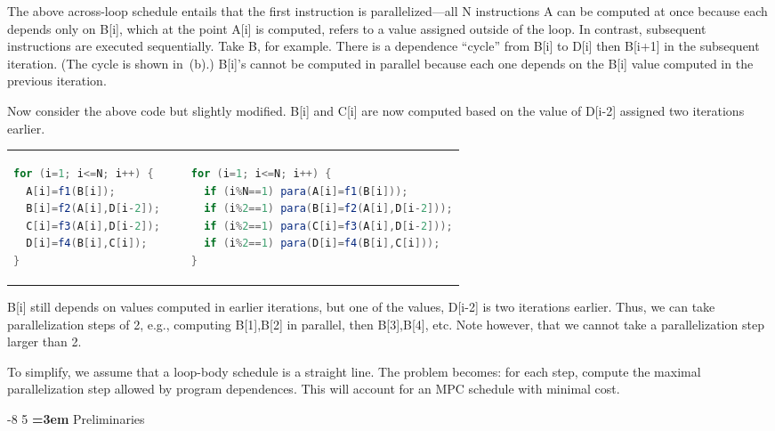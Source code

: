 \documentclass[sigconf, screen, natbib=false, dvipsnames, table]{acmart}
\makeatletter
\renewcommand{\subsection}{\@startsection{subsection}{2}{\z@}%
                        {-8\p@ \@plus -4\p@ \@minus -4\p@}%
                        {5\p@ \@plus 2\p@ \@minus 2\p@}%
                        {\normalfont\Large\bfseries\boldmath
                         \rightskip=\z@ \@plus 3em\pretolerance=10000 }}
\theoremstyle{definition}
\makeatother
\begin{document}
The above across-loop schedule entails that the first instruction is parallelized---all
N instructions A can be computed at once because each depends only on {\sf B[i]}, 
which at the point {\sf A[i]} is computed, refers to a value assigned outside of the loop. 
In contrast, subsequent instructions are executed sequentially. Take B, for example. 
There is a dependence ``cycle'' from {\sf B[i]} to {\sf D[i]} then {\sf B[i+1]} in the subsequent 
iteration. (The cycle is shown in~(b).) {\sf B[i]}'s cannot be computed 
in parallel because each one depends on the {\sf B[i]} value computed in the previous iteration.

Now consider the above code but slightly modified. {\sf B[i]} and {\sf C[i]} are now 
computed based on the value of {\sf D[i-2]} assigned two iterations earlier.

\begin{tabular}{lll}
\begin{lstlisting}[language=Java]
for (i=1; i<=N; i++) {
  A[i]=f1(B[i]);
  B[i]=f2(A[i],D[i-2]);
  C[i]=f3(A[i],D[i-2]);
  D[i]=f4(B[i],C[i]);
}	

\end{lstlisting}
& 
~
&
\begin{lstlisting}[language=Java]
for (i=1; i<=N; i++) {
  if (i%N==1) para(A[i]=f1(B[i]));
  if (i%2==1) para(B[i]=f2(A[i],D[i-2]));
  if (i%2==1) para(C[i]=f3(A[i],D[i-2]));
  if (i%2==1) para(D[i]=f4(B[i],C[i]));
}	
\end{lstlisting}

\end{tabular}

{\sf B[i]} still depends on values computed in earlier iterations, but one of the values, D[i-2] 
is two iterations earlier. Thus, we can take parallelization steps of 2, e.g., computing 
{\sf B[1],B[2]} in parallel, then {\sf B[3],B[4]}, etc.
Note however, that we cannot take a parallelization step larger than 2.

To simplify, we assume that a loop-body schedule is a straight line. 
The problem becomes: for each step, compute the maximal parallelization 
step allowed by program dependences. This will account for an MPC schedule with 
minimal cost. 

\subsection{Preliminaries}
\end{document}
